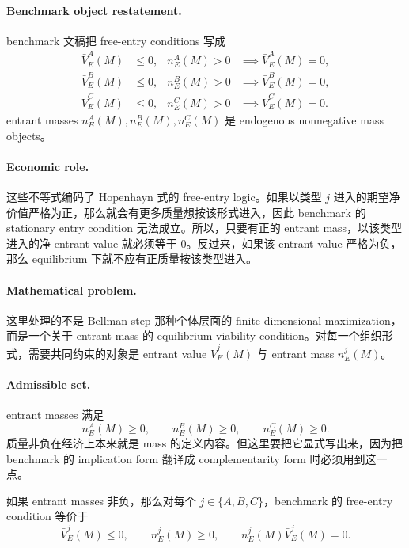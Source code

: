 \paragraph{Benchmark object restatement.}
benchmark 文稿把 free-entry conditions 写成
\begin{align*}
\bar V_E^A(M) &\le 0, & n_E^A(M)>0 &\implies \bar V_E^A(M)=0,\\
\bar V_E^B(M) &\le 0, & n_E^B(M)>0 &\implies \bar V_E^B(M)=0,\\
\bar V_E^C(M) &\le 0, & n_E^C(M)>0 &\implies \bar V_E^C(M)=0.
\end{align*}
entrant masses $n_E^A(M),n_E^B(M),n_E^C(M)$ 是 endogenous nonnegative mass objects。

\paragraph{Economic role.}
这些不等式编码了 Hopenhayn 式的 free-entry logic。如果以类型 $j$ 进入的期望净价值严格为正，那么就会有更多质量想按该形式进入，因此 benchmark 的 stationary entry condition 无法成立。所以，只要有正的 entrant mass，以该类型进入的净 entrant value 就必须等于 0。反过来，如果该 entrant value 严格为负，那么 equilibrium 下就不应有正质量按该类型进入。

\paragraph{Mathematical problem.}
这里处理的不是 Bellman step 那种个体层面的 finite-dimensional maximization，而是一个关于 entrant mass 的 equilibrium viability condition。对每一个组织形式，需要共同约束的对象是 entrant value $\bar V_E^j(M)$ 与 entrant mass $n_E^j(M)$。

\paragraph{Admissible set.}
entrant masses 满足
\[
n_E^A(M)\ge 0,\qquad n_E^B(M)\ge 0,\qquad n_E^C(M)\ge 0.
\]
质量非负在经济上本来就是 mass 的定义内容。但这里要把它显式写出来，因为把 benchmark 的 implication form 翻译成 complementarity form 时必须用到这一点。

\begin{proposition}
如果 entrant masses 非负，那么对每个 $j\in\{A,B,C\}$，benchmark 的 free-entry condition 等价于
\[
\bar V_E^j(M)\le 0,\qquad n_E^j(M)\ge 0,\qquad n_E^j(M)\bar V_E^j(M)=0.
\]
\end{proposition}

